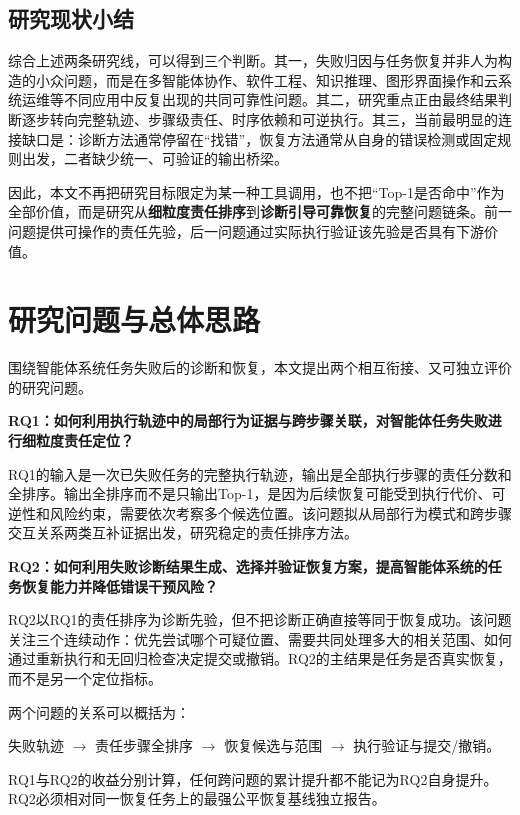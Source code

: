 \subsection{研究现状小结}

综合上述两条研究线，可以得到三个判断。其一，失败归因与任务恢复并非人为构造的小众问题，而是在多智能体协作、软件工程、知识推理、图形界面操作和云系统运维等不同应用中反复出现的共同可靠性问题。其二，研究重点正由最终结果判断逐步转向完整轨迹、步骤级责任、时序依赖和可逆执行。其三，当前最明显的连接缺口是：诊断方法通常停留在“找错”，恢复方法通常从自身的错误检测或固定规则出发，二者缺少统一、可验证的输出桥梁。

因此，本文不再把研究目标限定为某一种工具调用，也不把“Top-1是否命中”作为全部价值，而是研究从\textbf{细粒度责任排序}到\textbf{诊断引导可靠恢复}的完整问题链条。前一问题提供可操作的责任先验，后一问题通过实际执行验证该先验是否具有下游价值。

\section{研究问题与总体思路}

围绕智能体系统任务失败后的诊断和恢复，本文提出两个相互衔接、又可独立评价的研究问题。

\textbf{RQ1：如何利用执行轨迹中的局部行为证据与跨步骤关联，对智能体任务失败进行细粒度责任定位？}

RQ1的输入是一次已失败任务的完整执行轨迹，输出是全部执行步骤的责任分数和全排序。输出全排序而不是只输出Top-1，是因为后续恢复可能受到执行代价、可逆性和风险约束，需要依次考察多个候选位置。该问题拟从局部行为模式和跨步骤交互关系两类互补证据出发，研究稳定的责任排序方法。

\textbf{RQ2：如何利用失败诊断结果生成、选择并验证恢复方案，提高智能体系统的任务恢复能力并降低错误干预风险？}

RQ2以RQ1的责任排序为诊断先验，但不把诊断正确直接等同于恢复成功。该问题关注三个连续动作：优先尝试哪个可疑位置、需要共同处理多大的相关范围、如何通过重新执行和无回归检查决定提交或撤销。RQ2的主结果是任务是否真实恢复，而不是另一个定位指标。

两个问题的关系可以概括为：

\begin{center}
  失败轨迹 $\longrightarrow$ 责任步骤全排序 $\longrightarrow$ 恢复候选与范围 $\longrightarrow$ 执行验证与提交/撤销。
\end{center}

RQ1与RQ2的收益分别计算，任何跨问题的累计提升都不能记为RQ2自身提升。RQ2必须相对同一恢复任务上的最强公平恢复基线独立报告。

